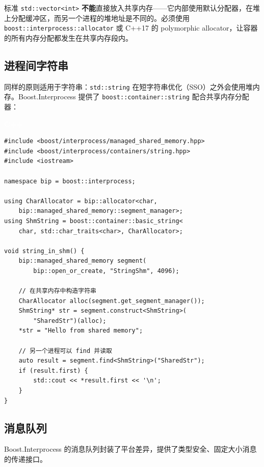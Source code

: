 \documentclass[12pt,a4paper,fontset=fandol]{ctexbook}
\newcommand{\cpp}[1]{C++#1}
\newcommand{\Tp}[1]{\texttt{#1}}
\newcommand{\cpplabel}{%
  \noindent\begin{tcolorbox}[sharp corners,colback=algheadbg,colframe=algheadbg,
    left=6pt,right=6pt,top=2pt,bottom=2pt,boxrule=0pt]
  \textcolor{white}{\small\bfseries\sffamily C++}\end{tcolorbox}%
}
\begin{document}
\begin{warning}[title=共享内存中的 STL 容器]
标准 \Tp{std::\allowbreak{}vector<int>} \textbf{不能}直接放入共享内存——它内部使用默认分配器，在堆上分配缓冲区，而另一个进程的堆地址是不同的。必须使用 \Tp{boost::\allowbreak{}interprocess::\allowbreak{}allocator} 或 \cpp{}17 的 polymorphic allocator，让容器的所有内存分配都发生在共享内存段内。
\end{warning}

\subsection{进程间字符串}

同样的原则适用于字符串：\Tp{std::string} 在短字符串优化（SSO）之外会使用堆内存。Boost.Interprocess 提供了 \Tp{boost::container::string} 配合共享内存分配器：

\cpplabel
\begin{lstlisting}
#include <boost/interprocess/managed_shared_memory.hpp>
#include <boost/interprocess/containers/string.hpp>
#include <iostream>

namespace bip = boost::interprocess;

using CharAllocator = bip::allocator<char,
    bip::managed_shared_memory::segment_manager>;
using ShmString = boost::container::basic_string<
    char, std::char_traits<char>, CharAllocator>;

void string_in_shm() {
    bip::managed_shared_memory segment(
        bip::open_or_create, "StringShm", 4096);

    // 在共享内存中构造字符串
    CharAllocator alloc(segment.get_segment_manager());
    ShmString* str = segment.construct<ShmString>(
        "SharedStr")(alloc);
    *str = "Hello from shared memory";

    // 另一个进程可以 find 并读取
    auto result = segment.find<ShmString>("SharedStr");
    if (result.first) {
        std::cout << *result.first << '\n';
    }
}
\end{lstlisting}

\subsection{消息队列}

Boost.Interprocess 的消息队列封装了平台差异，提供了类型安全、固定大小消息的传递接口。
\end{document}
